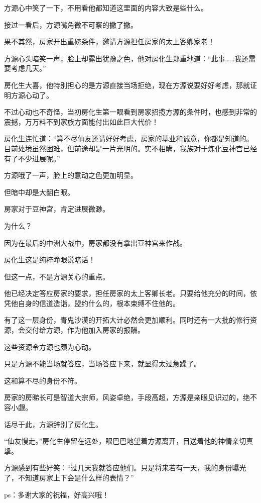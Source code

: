 \begin{this_body}
方源心中笑了一下，不用看他都知道这里面的内容大致是些什么。

接过一看后，方源嘴角微不可察的撇了撇。

果不其然，房家开出重磅条件，邀请方源担任房家的太上客卿家老！

方源心头暗笑一声，脸上却露出犹豫之色，他对房化生郑重地道：“此事……我还需要考虑几天。”

房化生大喜，他特别担心的是方源直接当场拒绝，现在方源说要好好考虑，那就证明方源心动了。

不过心动也不奇怪，当初房化生第一眼看到房家招揽方源的条件时，也感到非常的震撼，万万料不到家族方面能付出如此巨大代价！

房化生连忙道：“算不尽仙友还请好好考虑，房家的基业和诚意，你都是知道的。目前处境虽然困难，但前途却是一片光明的。实不相瞒，我族对于炼化豆神宫已经有了不少进展呢。”

方源哦了一声，脸上的意动之色更加明显。

但暗中却是大翻白眼。

房家对于豆神宫，肯定进展微渺。

为什么？

因为在最后的中洲大战中，房家都没有拿出豆神宫来作战。

房化生这是纯粹睁眼说瞎话！

但这一点，不是方源关心的重点。

他已经决定答应房家的要求，担任房家的太上客卿长老。只要给他充分的时间，依凭他自身的信道造诣，盟约什么的，根本束缚不住他的。

有了这一层身份，青鬼沙漠的开拓大计必然会更加顺利。同时还有一大批的修行资源，会交付给方源，作为他加入房家的报酬。

这些资源令方源也颇为心动。

只是方源不能当场就答应，当场答应下来，就显得太过急躁了。

这和算不尽的身份不符。

房家的房睇长可是智道大宗师，风姿卓绝，手段高超，方源是亲眼见识过的，绝不容小觑。

话尽于此，方源辞别了房化生。

“仙友慢走。”房化生停留在远处，眼巴巴地望着方源离开，目送着他的神情亲切真挚。

方源感到有些好笑：“过几天我就答应他们。只是将来若有一天，我的身份曝光了，不知道房家上下会是什么样的表情？”

ps：多谢大家的祝福，好高兴哦！

\end{this_body}


